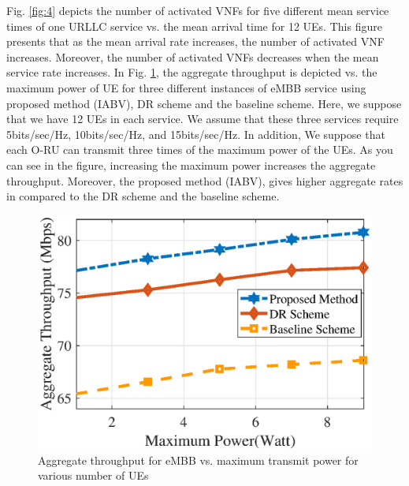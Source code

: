 \documentclass[lettersize,journal]{IEEEtran}
\begin{document}
Fig. \ref{fig:4} depicts the number of activated VNFs for five different mean service times of one URLLC service vs. the mean arrival time for 12 UEs. This figure presents that as the mean arrival rate increases, the number of activated VNF increases. Moreover, the number of activated VNFs decreases when the mean service rate increases.
In Fig. \ref{fig:5}, the aggregate throughput is depicted vs. the maximum power of UE for three different instances of eMBB service using proposed method (IABV), DR scheme and the baseline scheme. Here, we suppose that we have 12 UEs in each service.  We assume that these three services require 5bits/sec/Hz, 10bits/sec/Hz, and 15bits/sec/Hz.
In addition, We suppose that each O-RU can transmit three times of the maximum power of the UEs. As you can see in the figure, increasing the maximum power increases the aggregate throughput. Moreover, the proposed method (IABV), gives higher aggregate rates in compared to the DR scheme and the baseline scheme.
\begin{figure}%
  \centering
    \includegraphics[scale = 0.5]{fig/RatePower1n.eps}
    \caption{Aggregate throughput for eMBB vs. maximum transmit power for various number of UEs }
  \label{fig:5}
\end{figure}
\end{document}
